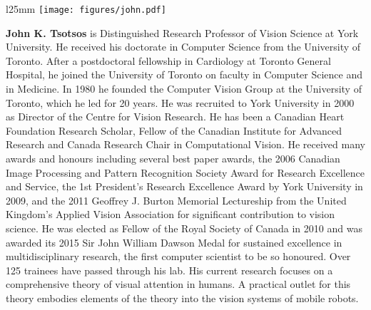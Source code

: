 \documentclass[10pt,journal,compsoc]{IEEEtran}
\begin{document}
\begin{wrapfigure}{l}{25mm} 
    \texttt{[image: figures/john.pdf]}
  \end{wrapfigure}\par
  \textbf{John K. Tsotsos} is Distinguished Research Professor of Vision Science at York University. He received
his doctorate in Computer Science from the University
of Toronto. After a postdoctoral fellowship in
Cardiology at Toronto General Hospital, he joined
the University of Toronto on faculty in Computer
Science and in Medicine. In 1980 he founded the
Computer Vision Group at the University of Toronto,
which he led for 20 years. He was recruited to
York University in 2000 as Director of the Centre
for Vision Research. He has been a Canadian Heart
Foundation Research Scholar, Fellow of the Canadian Institute for Advanced
Research and Canada Research Chair in Computational Vision. He received
many awards and honours including several best paper awards, the 2006
Canadian Image Processing and Pattern Recognition Society Award for
Research Excellence and Service, the 1st President’s Research Excellence
Award by York University in 2009, and the 2011 Geoffrey J. Burton Memorial
Lectureship from the United Kingdom’s Applied Vision Association for
significant contribution to vision science. He was elected as Fellow of the Royal Society of Canada in 2010 and was awarded its 2015 Sir John William Dawson Medal for sustained excellence in multidisciplinary research, the first computer scientist to be so honoured. Over 125 trainees have passed through his lab. His current research focuses on a comprehensive theory of visual attention in humans. A practical outlet for this theory embodies elements of the theory into the vision systems of mobile robots.\par
\end{document}
